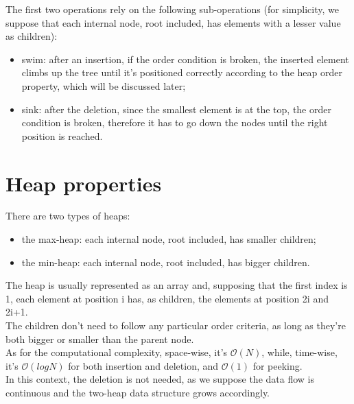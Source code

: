 \documentclass[paper=a4wide, fontsize=12pt]{scrartcl}	 %
\begin{document}
The first two operations rely on the following sub-operations (for simplicity, we suppose that each internal node, root included, has elements with a lesser value as children):
\begin{itemize}
    \item swim: after an insertion, if the order condition is broken, the inserted element climbs up the tree until it's positioned correctly according to the heap order property, which will be discussed later;
    \item sink: after the deletion, since the smallest element is at the top, the order condition is broken, therefore it has to go down the nodes until the right position is reached.
\end{itemize}


\section*{Heap properties}
There are two types of heaps:
\begin{itemize}
    \item the max-heap: each internal node, root included, has smaller children;
    \item the min-heap: each internal node, root included, has bigger children.
\end{itemize}

The heap is usually represented as an array and, supposing that the first index is 1, each element at position i has, as children, the elements at position 2i and 2i+1.\\
The children don't need to follow any particular order criteria, as long as they're both bigger or smaller than the parent node. \\

As for the computational complexity, space-wise, it's $\mathcal{O}(N)$, while, time-wise, it's $\mathcal{O}(log N)$ for both insertion and deletion, and $\mathcal{O}(1)$ for peeking.\\
In this context, the deletion is not needed, as we suppose the data flow is continuous and the two-heap data structure grows accordingly.
\end{document}
